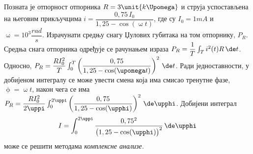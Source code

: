 \PID \mnAdvanced
Позната је  отпорност отпорника $R = 3\unit{k\Upomega}$ и струја
успостављена на његовим прикључцима
$i = \dfrac{0,75\,I_0}{1,25 - \cos(\upomega t)}$,
где су $I_0 = 1\unit{mA}$ и $\upomega 
= 10^3\unit{\dfrac{rad}{s}}$. Израчунати средњу снагу Џулових губитака на том отпорнику, $P_R$.
\\[2mm]

\RESENJE 
Средња снага отпорника одређује се рачунањем израза
$P_R = \dfrac{1}{T}\int_{T} i^2(t) R \, \de t$. Односно,
$P_R = \dfrac{R I_0^2}{T}\int_0^T 
\left(
\dfrac{0,75}{1,25 - \cos(\upomega t)}
\right)^2
 \, \de t$. Ради једноставности, у добијеном интегралу
 се може увести смена која има смисао 
 тренутне фазе, $\upphi = \upomega t$, након чега 
се има
$P_R = \dfrac{R I_0^2}{2\uppi }\int_0^{2\uppi} 
\left(
\dfrac{0,75}{1,25 - \cos(\upphi)}
\right)^2
 \, \de \upphi$. Добијени интеграл 
\begin{equation}
I = \int_0^{2\uppi} 
\frac{0,75^2}{
\bigl(1,25 - \cos(\upphi)\bigr)^2
}
 \, \de \upphi \label{1}
\end{equation} 
 може се решити 
методама \textit{комплексне анализе.}

